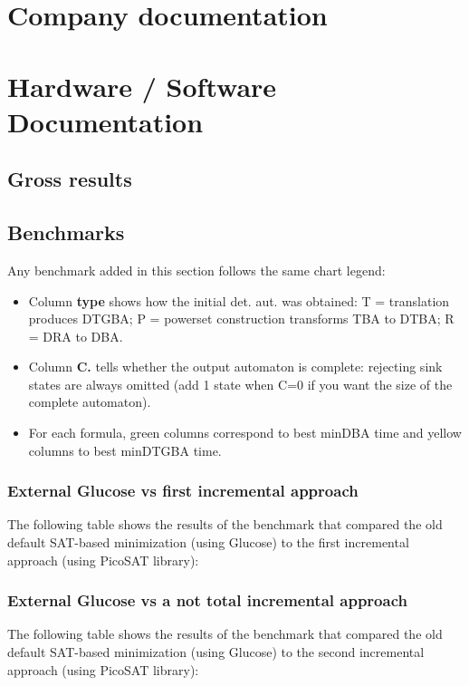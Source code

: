 \chapter{Company documentation}
\chapter{Hardware / Software Documentation}

\begin{landscape}
\chapter{Gross results}

\section{Benchmarks}
Any benchmark added in this section follows the same chart legend:\\
\begin{itemize}
 \item Column \textbf{type} shows how the initial det. aut. was obtained: T = translation produces DTGBA;
       P = powerset construction transforms TBA to DTBA; R = DRA to DBA.
 \item Column \textbf{C.} tells whether the output automaton is complete: rejecting sink states are always
       omitted (add 1 state when C=0 if you want the size of the complete automaton).
 \item For each formula, green columns correspond to best minDBA time and yellow columns to best minDTGBA
       time.
\end{itemize}

\subsection{External Glucose vs first incremental approach}
\label{glu_vs_incr1_complete}
The following table shows the results of the benchmark that compared the old default SAT-based minimization
(using Glucose) to the first incremental approach (using PicoSAT library):\\

\subsection{External Glucose vs a not total incremental approach}
\label{glu_vs_incr2_complete}
The following table shows the results of the benchmark that compared the old default SAT-based minimization
(using Glucose) to the second incremental approach (using PicoSAT library):\\


\end{landscape}

